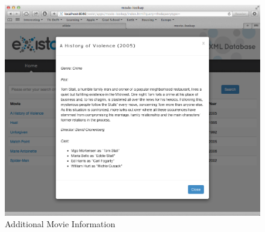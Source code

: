 \documentclass[MoviesApp.tex]{subfiles}
\begin{document}
\begin{figure} [H]
	\centering
	\includegraphics[width=1\textwidth]{./Figures/MovieAppSelected.png}
	\caption{Additional Movie Information}
	\label{fig:movieappselected}
\end{figure}
\end{document}
